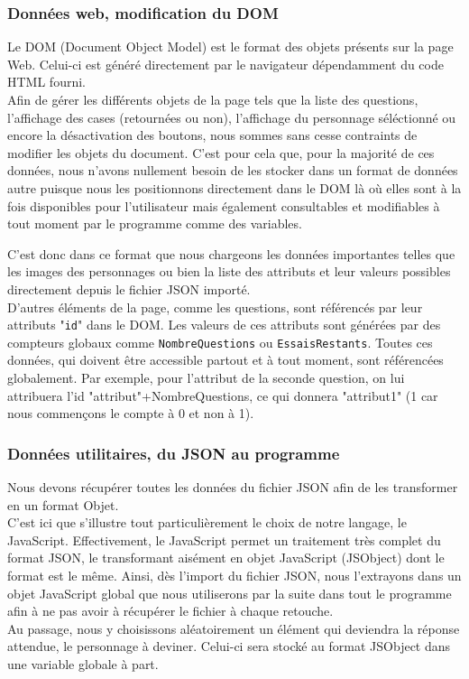\documentclass{article}
\begin{document}
  		    \subsubsection{Données web, modification du DOM}
  		        \par Le DOM (Document Object Model) est le format des objets présents sur la page Web. Celui-ci est généré directement par le navigateur dépendamment du code HTML fourni.\\
  		        Afin de gérer les différents objets de la page tels que la liste des questions, l'affichage des cases (retournées ou non), l'affichage du personnage séléctionné ou encore la désactivation des boutons, nous sommes sans cesse contraints de modifier les objets du document. C'est pour cela que, pour la majorité de ces données, nous n'avons nullement besoin de les stocker dans un format de données autre puisque nous les positionnons directement dans le DOM là où elles sont à la fois disponibles pour l'utilisateur mais également consultables et modifiables à tout moment par le programme comme des variables.\\
  		        \par C'est donc dans ce format que nous chargeons les données importantes telles que les images des personnages ou bien la liste des attributs et leur valeurs possibles directement depuis le fichier JSON importé.\\
  		        D'autres éléments de la page, comme les questions, sont référencés par leur attributs "\texttt{id}" dans le DOM. Les valeurs de ces attributs sont générées par des compteurs globaux comme \texttt{NombreQuestions} ou \texttt{EssaisRestants}. Toutes ces données, qui doivent être accessible partout et à tout moment, sont référencées globalement. Par exemple, pour l'attribut de la seconde question, on lui attribuera l'id "attribut"+NombreQuestions, ce qui donnera "attribut1" (1 car nous commençons le compte à 0 et non à 1).
  		    \pagebreak
  		    \subsubsection{Données utilitaires, du JSON au programme}
  		        Nous devons récupérer toutes les données du fichier JSON afin de les transformer en un format Objet.\\
  		        C'est ici que s'illustre tout particulièrement le choix de notre langage, le JavaScript. Effectivement, le JavaScript permet un traitement très complet du format JSON, le transformant aisément en objet JavaScript (JSObject) dont le format est le même. Ainsi, dès l'import du fichier JSON, nous l'extrayons dans un objet JavaScript global que nous utiliserons par la suite dans tout le programme afin à ne pas avoir à récupérer le fichier à chaque retouche.\\
  		        Au passage, nous y choisissons aléatoirement un élément qui deviendra la réponse attendue, le personnage à deviner. Celui-ci sera stocké au format JSObject dans une variable globale à part.
		
\end{document}
